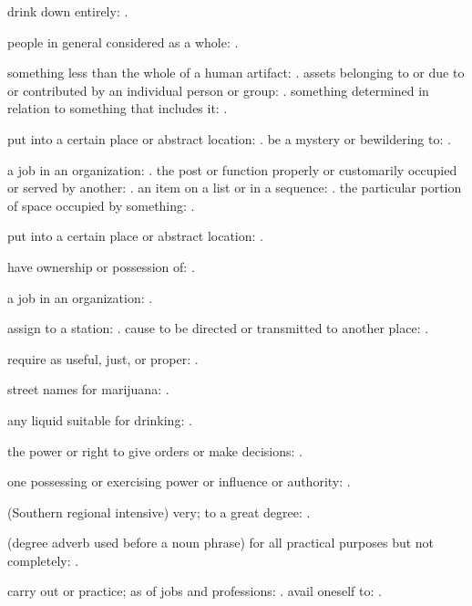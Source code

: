   drink down entirely: .

  people in general considered as a whole: .

  something less than the whole of a human artifact: . assets belonging to or due to or contributed by an individual person or group: . something determined in relation to something that includes it: .

  put into a certain place or abstract location: . be a mystery or bewildering to: .

  a job in an organization: . the post or function properly or customarily occupied or served by another: . an item on a list or in a sequence: . the particular portion of space occupied by something: .

  put into a certain place or abstract location: .

  have ownership or possession of: .

  a job in an organization: .

  assign to a station: . cause to be directed or transmitted to another place: .

  require as useful, just, or proper: .

  street names for marijuana: .

  any liquid suitable for drinking: .

  the power or right to give orders or make decisions: .

  one possessing or exercising power or influence or authority: .

  (Southern regional intensive) very; to a great degree: .

  (degree adverb used before a noun phrase) for all practical purposes but not completely: .

  carry out or practice; as of jobs and professions: . avail oneself to: .

